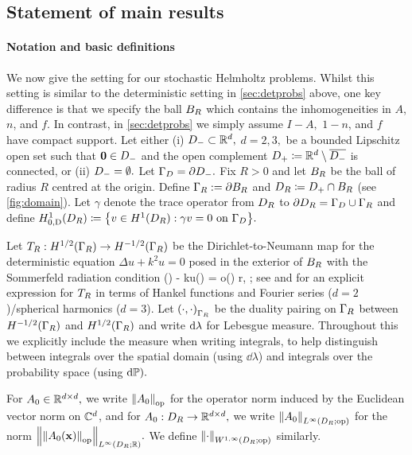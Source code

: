 \subsection{Statement of main results}\label{sec:hh-results}

\paragraph{Notation and basic definitions} We now give the setting for our stochastic Helmholtz problems. Whilst this setting is similar to the deterministic setting in \cref{sec:detprobs} above, one key difference is that we specify the ball $B_{R}$ which contains the inhomogeneities in $A$, $n$, and $f$. In contrast, in \cref{sec:detprobs} we simply assume $I-A,$ $1-n$, and $f$ have compact support. Let either (i) $D_{-} \subset \mathbb R^{d},$ $d=2,3,$ be a bounded Lipschitz open set such that $\mathbf{0} \in D_{-}$ and the open complement $D_{+}\coloneqq \mathbb R^d\setminus \overline{D_{-}}$ is connected, or (ii) $D_{-} = \emptyset.$ Let $\Gamma_{D} = \partial D_{-}.$ 
Fix $R>0$ and let $B_{R}$ be the ball of radius $R$ centred at the origin. Define $\Gamma_{R} := \partial B_{R}$ and $D_{R} \coloneqq D_{+} \cap B_{R}$ (see \cref{fig:domain}). Let $\gamma$ denote the trace operator from $D_{R}$ to $\partial D_{R} = \Gamma_{D} \cup \Gamma_{R}$ and define $\HozDDR \de \set{v \in \HoDR \st \gamma v = 0 \ton \GD}.$ 
 
Let $T_{R}: H^{1/2}(\Gamma_R) \rightarrow H^{-1/2}(\Gamma_R)$ be the Dirichlet-to-Neumann map for the deterministic equation $\Delta u+k^2 u=0$ posed in the exterior of $B_{R}$ with the Sommerfeld radiation condition 
\beq\label{eq:src}
(\bx) - \ri ku(\bx) = o\mleft(\mright)  r\de\abs{\bx}\rightarrow \infty,  \frac{\bx}{\abs{\bx}};
\eeq
see \cite[Section 2.6.3]{Ne:01} and \cite[Equations 3.5 and 3.6]{ChMo:08} for an explicit expression for $T_{R}$  in terms of Hankel functions and Fourier series ($d=2$)/spherical harmonics ($d=3$). Let $\IPGR{\cdot}{\cdot}$ be the duality pairing on $\Gamma_{R}$ between $\HmhGR$ and $\HhGR$ and write $\mathrm{d}\lambda$ for Lebesgue measure. Throughout this  we explicitly include the measure when writing integrals, to help distinguish between integrals over the spatial domain (using $\dd\lambda$) and integrals over the probability space (using $\mathrm{d}\mathbb P).$

For $A_{0} \in \mathbb R^{d\times d},$ we write $\NopCCd{\Az}$ for the operator norm induced by the Euclidean vector norm on $\mathbb C^{d}$, and for $A_{0}:D_{R} \rightarrow \mathbb R^{d\times d},$ we write $\NLiDRRRdtd{\Az}$ for the norm $\NLiDRRR{\Nop{\Az(\bx)}}.$ We define $\NWoiDRRRdtd{\cdot}$ similarly.

